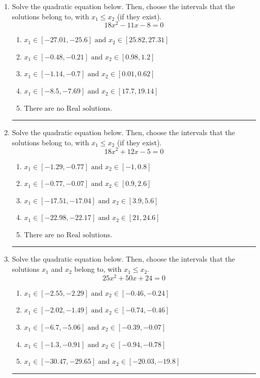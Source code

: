 \documentclass[14pt]{extbook}
\newcommand{\litem}[1]{\item#1\hspace*{-1cm}\rule{\textwidth}{0.4pt}}
\begin{document}
\begin{enumerate}
\litem{
Solve the quadratic equation below. Then, choose the intervals that the solutions belong to, with $x_1 \leq x_2$ (if they exist).\[ 18x^{2} -11 x -8 = 0 \]\begin{enumerate}[label=\Alph*.]
\item \( x_1 \in [-27.01, -25.6] \text{ and } x_2 \in [25.82, 27.31] \)
\item \( x_1 \in [-0.48, -0.21] \text{ and } x_2 \in [0.98, 1.2] \)
\item \( x_1 \in [-1.14, -0.7] \text{ and } x_2 \in [0.01, 0.62] \)
\item \( x_1 \in [-8.5, -7.69] \text{ and } x_2 \in [17.7, 19.14] \)
\item \( \text{There are no Real solutions.} \)

\end{enumerate} }
\litem{
Solve the quadratic equation below. Then, choose the intervals that the solutions belong to, with $x_1 \leq x_2$ (if they exist).\[ 18x^{2} +12 x -5 = 0 \]\begin{enumerate}[label=\Alph*.]
\item \( x_1 \in [-1.29, -0.77] \text{ and } x_2 \in [-1, 0.8] \)
\item \( x_1 \in [-0.77, -0.07] \text{ and } x_2 \in [0.9, 2.6] \)
\item \( x_1 \in [-17.51, -17.04] \text{ and } x_2 \in [3.9, 5.6] \)
\item \( x_1 \in [-22.98, -22.17] \text{ and } x_2 \in [21, 24.6] \)
\item \( \text{There are no Real solutions.} \)

\end{enumerate} }
\litem{
Solve the quadratic equation below. Then, choose the intervals that the solutions $x_1$ and $x_2$ belong to, with $x_1 \leq x_2$.\[ 25x^{2} +50 x + 24 = 0 \]\begin{enumerate}[label=\Alph*.]
\item \( x_1 \in [-2.55, -2.29] \text{ and } x_2 \in [-0.46, -0.24] \)
\item \( x_1 \in [-2.02, -1.49] \text{ and } x_2 \in [-0.74, -0.46] \)
\item \( x_1 \in [-6.7, -5.06] \text{ and } x_2 \in [-0.39, -0.07] \)
\item \( x_1 \in [-1.3, -0.91] \text{ and } x_2 \in [-0.94, -0.78] \)
\item \( x_1 \in [-30.47, -29.65] \text{ and } x_2 \in [-20.03, -19.8] \)


\end{enumerate}}
\end{enumerate}
\end{document}
